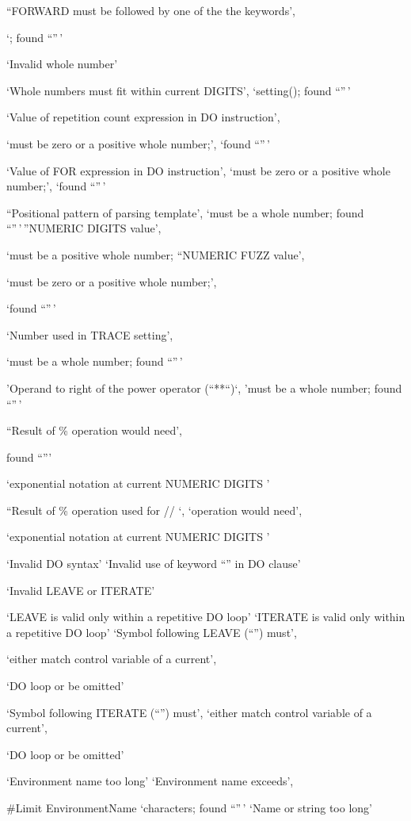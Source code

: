 ``FORWARD must be followed by one of the the keywords',

`; found ``''\,'

`Invalid whole number'

`Whole numbers must fit within current DIGITS', `setting(); found
``''\,'

`Value of repetition count expression in DO instruction',

`must be zero or a positive whole number;', `found ``''\,'

`Value of FOR expression in DO instruction', `must be zero or a positive
whole number;', `found ``''\,'

``Positional pattern of parsing template', `must be a whole number;
found ``''\,'\,''NUMERIC DIGITS value',

`must be a positive whole number; ``NUMERIC FUZZ value',

`must be zero or a positive whole number;',

`found ``''\,'

`Number used in TRACE setting',

`must be a whole number; found ``''\,'

'Operand to right of the power operator (``**``)`, 'must be a whole
number; found ``''\,'

``Result of \% operation would need',

found ``'''

`exponential notation at current NUMERIC DIGITS '

``Result of \% operation used for // `, `operation would need',

`exponential notation at current NUMERIC DIGITS '

`Invalid DO syntax' `Invalid use of keyword ``'' in DO clause'

`Invalid LEAVE or ITERATE'

`LEAVE is valid only within a repetitive DO loop' `ITERATE is valid only
within a repetitive DO loop' `Symbol following LEAVE (``'') must',

`either match control variable of a current',

`DO loop or be omitted'

`Symbol following ITERATE (``'') must', `either match control variable
of a current',

`DO loop or be omitted'

`Environment name too long' `Environment name exceeds',

\#Limit EnvironmentName `characters; found ``''\,' `Name or string too
long'

